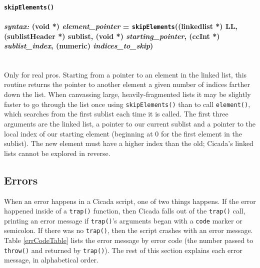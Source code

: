 \documentclass{article}
\begin{document}
\paragraph{\texttt{skipElements()}\\\\
\normalfont \emph{syntax: } (void *) \emph{element\_pointer} = \texttt{skipElements}((linkedlist *) LL, (sublistHeader *) sublist, (void *) \emph{starting\_pointer}, (ccInt *) \emph{sublist\_index}, (numeric) \emph{indices\_to\_skip})\\\\}

Only for real pros.  Starting from a pointer to an element in the linked list, this routine returns the pointer to another element a given number of indices farther down the list.  When canvassing large, heavily-fragmented lists it may be slightly faster to go through the list once using \texttt{skipElements()} than to call \texttt{element()}, which searches from the first sublist each time it is called.  The first three arguments are the linked list, a pointer to our current sublist and a pointer to the local index of our starting element (beginning at 0 for the first element in the sublist).  The new element must have a higher index than the old; Cicada's linked lists cannot be explored in reverse.\\





\subsection{Errors}

When an error happens in a Cicada script, one of two things happens.  If the error happened inside of a \verb#trap()# function, then Cicada falls out of the \verb#trap()# call, printing an error message if \verb#trap()#'s arguments began with a \verb#code# marker or semicolon.  If there was no \verb#trap()#, then the script crashes with an error message.  Table \ref{errCodeTable} lists the error message by error code (the number passed to \verb#throw()# and returned by \verb#trap()#).  The rest of this section explains each error message, in alphabetical order.
\end{document}

